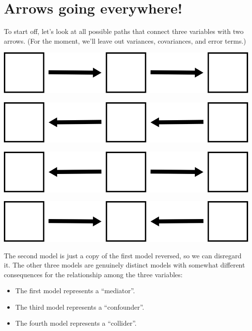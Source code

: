 \documentclass[
]{book}
\providecommand{\tightlist}{%
  \setlength{\itemsep}{0pt}\setlength{\parskip}{0pt}}
\begin{document}
\hypertarget{mediation-arrows}{%
\section{Arrows going everywhere!}\label{mediation-arrows}}

To start off, let's look at all possible paths that connect three variables with two arrows. (For the moment, we'll leave out variances, covariances, and error terms.)

\begin{center}\includegraphics{graphics/mediator_right} \end{center}

\begin{center}\includegraphics{graphics/mediator_left} \end{center}

\begin{center}\includegraphics{graphics/confounder} \end{center}

\begin{center}\includegraphics{graphics/collider} \end{center}

The second model is just a copy of the first model reversed, so we can disregard it. The other three models are genuinely distinct models with somewhat different consequences for the relationship among the three variables:

\begin{itemize}
\tightlist
\item
  The first model represents a ``mediator''.
\item
  The third model represents a ``confounder''.
\item
  The fourth model represents a ``collider''.
\end{itemize}
\end{document}
